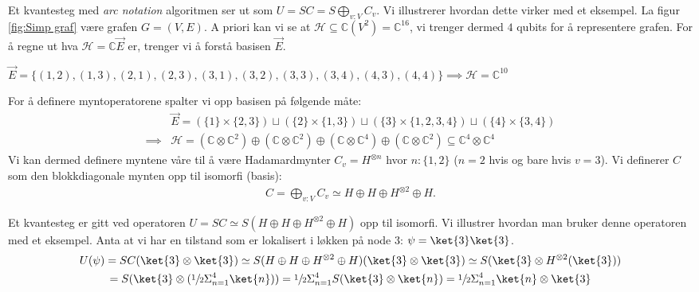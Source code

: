         Et kvantesteg med \emph{arc notation} algoritmen ser ut som $U = SC = S\bigoplus_{v:V}C_v$. Vi illustrerer hvordan dette virker med et eksempel. La figur \ref{fig:Simp graf} være grafen $G=(V,E)$. A priori kan vi se at $\mathcal{H}\subseteq\mathbb{C}(V^2)=\mathbb{C}^{16}$, vi trenger dermed $4$ qubits for å representere grafen. For å regne ut hva $\mathcal{H}=\mathbb{C}\vec{E}$ er, trenger vi å forstå basisen $\vec{E}$.
        \begin{center}
            \begin{math}
                \vec{E} = \{(1,2),(1,3),(2,1),(2,3),(3,1),(3,2),(3,3),(3,4),(4,3),(4,4)\}
                \implies \mathcal{H} = \mathbb{C}^{10}
            \end{math}
        \end{center}

        For å definere myntoperatorene spalter vi opp basisen på følgende måte:
        \begin{align*}
            & \vec{E} = (\{1\}\times\{2,3\})\sqcup(\{2\}\times\{1,3\})\sqcup(\{3\}\times\{1,2,3,4\})\sqcup(\{4\}\times\{3,4\}) \\
            \implies & \mathcal{H} = (\mathbb{C}\otimes\mathbb{C}^2)\oplus(\mathbb{C}\otimes\mathbb{C}^2)\oplus(\mathbb{C}\otimes\mathbb{C}^4)\oplus(\mathbb{C}\otimes\mathbb{C}^2) \subseteq \mathbb{C}^4\otimes\mathbb{C}^4
        \end{align*}
        Vi kan dermed definere myntene våre til å være Hadamardmynter $C_v=H^{\otimes n}$ hvor $n:\{1,2\}$ ($n=2$ hvis og bare hvis $v=3$). Vi definerer $C$ som den blokkdiagonale mynten opp til isomorfi (basis):
        \begin{align*}
            C = \bigoplus_{v:V}C_v\simeq H\oplus H\oplus H^{\otimes 2}\oplus H.
        \end{align*}

        Et kvantesteg er gitt ved operatoren $U=SC\simeq S(H\oplus H\oplus H^{\otimes 2}\oplus H)$ opp til isomorfi. Vi illustrer hvordan man bruker denne operatoren med et eksempel. Anta at vi har en tilstand som er lokalisert i løkken på node $3$: $\psi = \ket{3}\ket{3}$.
        \begin{multline*}
            U(\psi)=SC(\ket{3}\otimes\ket{3})\simeq S(H\oplus H\oplus H^{\otimes 2}\oplus H)(\ket{3}\otimes\ket{3})\simeq S(\ket{3}\otimes H^{\otimes 2}(\ket{3})) \\ = S(\ket{3}\otimes(\sfrac{1}{2}\Sigma_{n=1}^4\ket{n}))=\sfrac{1}{2}\Sigma_{n=1}^4S(\ket{3}\otimes\ket{n}) = \sfrac{1}{2}\Sigma_{n=1}^4\ket{n}\otimes\ket{3}
        \end{multline*}

